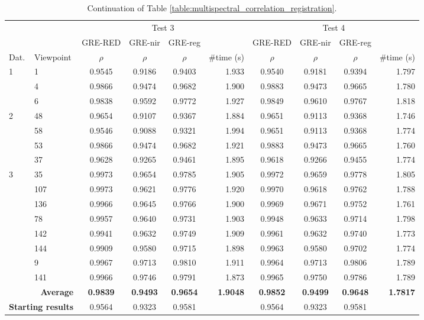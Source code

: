 \renewcommand{\arraystretch}{1.2}
\begin{table}
    \footnotesize
    \caption{Continuation of Table \ref{table:multispectral_correlation_registration}.}
    \begin{tabular}{ll|cccr|cccr}
        \toprule
        \multicolumn{2}{c}{} & \multicolumn{4}{c}{Test 3} & \multicolumn{4}{c}{Test 4}\\
        \cmidrule{1-10}
        & & GRE-RED & GRE-\acrshort{nir} & GRE-\acrshort{reg} & & GRE-RED & GRE-\acrshort{nir} & GRE-\acrshort{reg}\\
        Dat. & Viewpoint & $\rho$ & $\rho$ & $\rho$ & \#time (\si{\second}) & $\rho$ & $\rho$ & $\rho$ & \#time (\si{\second}) \\
        \cmidrule{1-10}
        \multirow{3}{*}{1} & 1 & 0.9545 & 0.9186 & 0.9403 & 1.933 & 0.9540 & 0.9181 & 0.9394 & 1.797\\
        & 4 & 0.9866 & 0.9474 & 0.9682 & 1.900 & 0.9883 & 0.9473 & 0.9665 & 1.780\\
        & 6 & 0.9838 & 0.9592 & 0.9772 & 1.927 & 0.9849 & 0.9610 & 0.9767 & 1.818\\
        \cmidrule{1-10}
        \multirow{4}{*}{2} & 48 & 0.9654 & 0.9107 & 0.9367 & 1.884 & 0.9651 & 0.9113 & 0.9368 & 1.746\\
        & 58 & 0.9546 & 0.9088 & 0.9321 & 1.994 & 0.9651 & 0.9113 & 0.9368 & 1.774\\
        & 53 & 0.9866 & 0.9474 & 0.9682 & 1.921 & 0.9883 & 0.9473 & 0.9665 & 1.760\\
        & 37 & 0.9628 & 0.9265 & 0.9461 & 1.895 & 0.9618 & 0.9266 & 0.9455 & 1.774\\
        \cmidrule{1-10}
        \multirow{8}{*}{3} & 35 & 0.9973 & 0.9654 & 0.9785 & 1.905 & 0.9972 & 0.9659 & 0.9778 & 1.805\\
        & 107 & 0.9973 & 0.9621 & 0.9776 & 1.920 & 0.9970 & 0.9618 & 0.9762 & 1.788\\
        & 136 & 0.9966 & 0.9645 & 0.9766 & 1.900 & 0.9969 & 0.9671 & 0.9752 & 1.761\\
        & 78 & 0.9957 & 0.9640 & 0.9731 & 1.903 & 0.9948 & 0.9633 & 0.9714 & 1.798\\
        & 142 & 0.9941 & 0.9632 & 0.9749 & 1.909 & 0.9961 & 0.9632 & 0.9740 & 1.773\\
        & 144 & 0.9909 & 0.9580 & 0.9715 & 1.898 & 0.9963 & 0.9580 & 0.9702 & 1.774\\
        & 9 & 0.9967 & 0.9713 & 0.9810 & 1.911 & 0.9964 & 0.9713 & 0.9806 & 1.789\\
        & 141 & 0.9966 & 0.9746 & 0.9791 & 1.873 & 0.9965 & 0.9750 & 0.9786 & 1.789\\
        \cmidrule{1-10}
        \multicolumn{2}{r|}{\textbf{Average}} & \textbf{0.9839} & \textbf{0.9493} & \textbf{0.9654} & \textbf{1.9048} & \textbf{0.9852} & \textbf{0.9499} & \textbf{0.9648} & \textbf{1.7817}\\
        \cmidrule{1-10}
        \multicolumn{2}{r|}{\textbf{Starting results}} & 0.9564 & 0.9323 & 0.9581 & & 0.9564 & 0.9323 & 0.9581 & \\
        \bottomrule
    \end{tabular}
    \normalsize
\end{table}
